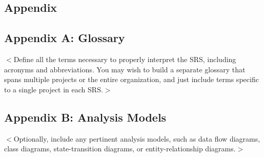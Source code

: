 \begin{appendices} 
	\chapter{Appendix} \label{chp:appendix}
	\section{Appendix A: Glossary}
	$<$Define all the terms necessary to properly interpret the SRS, including 
	acronyms and abbreviations. You may wish to build a separate glossary that spans 
	multiple projects or the entire organization, and just include terms specific to 
	a single project in each SRS.$>$
	
	\section{Appendix B: Analysis Models}
	$<$Optionally, include any pertinent analysis models, such as data flow 
	diagrams, class diagrams, state-transition diagrams, or entity-relationship 
	diagrams.$>$
	

\end{appendices}
